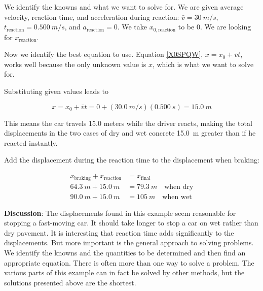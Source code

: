 \documentclass[dvipsnames]{article}
\begin{document}
\vspace{1em}

We identify the knowns and what we want to solve for. We are given average velocity, reaction time, and acceleration during reaction: $\bar{v} = \SI{30}{m/s}$, $t_{\text{reaction}} = \SI{0.500}{m/s}$, and $a_{\text{reaction}} = 0$.  We take $x_{0,\text{reaction}}$ to be 0. We are looking for $x_{\text{reaction}}$. 

\vspace{1em} 

Now we identify the best equation to use. Equation \eqref{X0SPQW}, $x = x_0 + \bar{v} t$, works well because the only unknown value is $x$, which is what we want to solve for. 

\vspace{1em}

Substituting given values leads to 

\begin{equation*}
    x = x_0 + \bar{v} t = 0 + \left(\SI{30.0}{m/s}\right) \left(\SI{0.500}{s}\right) = \SI{15.0}{m}
\end{equation*}

This means the car travels 15.0 meters while the driver reacts, making the total displacements in the two cases of dry and wet concrete \SI{15.0}{m} greater than if he reacted instantly.

\vspace{1em}

Add the displacement during the reaction time to the displacement when braking:

\begin{align*}
    x_{\text{braking}} + x_{\text{reaction}} &= x_{\text{final}}\\[1ex]
    \SI{64.3}{m} + \SI{15.0}{m} &= \SI{79.3}{m} \quad \text{when dry}\\
    \SI{90.0}{m} + \SI{15.0}{m} &= \SI{105}{m} \quad \text{when wet}
\end{align*}

\textbf{Discussion}: The displacements found in this example seem reasonable for stopping a fast-moving car. It should take longer to stop a car on wet rather than dry pavement. It is interesting that reaction time adds significantly to the displacements. But more important is the general approach to solving problems. We identify the knowns and the quantities to be determined and then find an appropriate equation. There is often more than one way to solve a problem. The various parts of this example can in fact be solved by other methods, but the solutions presented above are the shortest.

\endsolution
 
\end{document}
